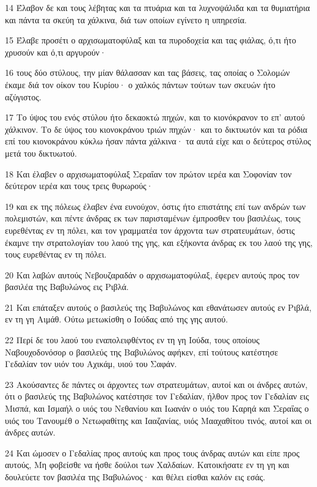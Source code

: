 \par 14 Έλαβον δε και τους λέβητας και τα πτυάρια και τα λυχνοψάλιδα και τα θυμιατήρια και πάντα τα σκεύη τα χάλκινα, διά των οποίων εγίνετο η υπηρεσία.
\par 15 Έλαβε προσέτι ο αρχισωματοφύλαξ και τα πυροδοχεία και τας φιάλας, ό,τι ήτο χρυσούν και ό,τι αργυρούν·
\par 16 τους δύο στύλους, την μίαν θάλασσαν και τας βάσεις, τας οποίας ο Σολομών έκαμε διά τον οίκον του Κυρίου· ο χαλκός πάντων τούτων των σκευών ήτο αζύγιστος.
\par 17 Το ύψος του ενός στύλου ήτο δεκαοκτώ πηχών, και το κιονόκρανον το επ' αυτού χάλκινον. Το δε ύψος του κιονοκράνου τριών πηχών· και το δικτυωτόν και τα ρόδια επί του κιονοκράνου κύκλω ήσαν πάντα χάλκινα· τα αυτά είχε και ο δεύτερος στύλος μετά του δικτυωτού.
\par 18 Και έλαβεν ο αρχισωματοφύλαξ Σεραΐαν τον πρώτον ιερέα και Σοφονίαν τον δεύτερον ιερέα και τους τρεις θυρωρούς·
\par 19 και εκ της πόλεως έλαβεν ένα ευνούχον, όστις ήτο επιστάτης επί των ανδρών των πολεμιστών, και πέντε άνδρας εκ των παρισταμένων έμπροσθεν του βασιλέως, τους ευρεθέντας εν τη πόλει, και τον γραμματέα τον άρχοντα των στρατευμάτων, όστις έκαμνε την στρατολογίαν του λαού της γης, και εξήκοντα άνδρας εκ του λαού της γης, τους ευρεθέντας εν τη πόλει.
\par 20 Και λαβών αυτούς Νεβουζαραδάν ο αρχισωματοφύλαξ, έφερεν αυτούς προς τον βασιλέα της Βαβυλώνος εις Ριβλά.
\par 21 Και επάταξεν αυτούς ο βασιλεύς της Βαβυλώνος και εθανάτωσεν αυτούς εν Ριβλά, εν τη γη Αιμάθ. Ούτω μετωκίσθη ο Ιούδας από της γης αυτού.
\par 22 Περί δε του λαού του εναπολειφθέντος εν τη γη Ιούδα, τους οποίους Ναβουχοδονόσορ ο βασιλεύς της Βαβυλώνος αφήκεν, επί τούτους κατέστησε Γεδαλίαν τον υιόν του Αχικάμ, υιού του Σαφάν.
\par 23 Ακούσαντες δε πάντες οι άρχοντες των στρατευμάτων, αυτοί και οι άνδρες αυτών, ότι ο βασιλεύς της Βαβυλώνος κατέστησε τον Γεδαλίαν, ήλθον προς τον Γεδαλίαν εις Μισπά, και Ισμαήλ ο υιός του Νεθανίου και Ιωανάν ο υιός του Καρηά και Σεραΐας ο υιός του Τανουμέθ ο Νετωφαθίτης και Ιααζανίας, υιός Μααχαθίτου τινός, αυτοί και οι άνδρες αυτών.
\par 24 Και ώμοσεν ο Γεδαλίας προς αυτούς και προς τους άνδρας αυτών και είπε προς αυτούς, Μη φοβείσθε να ήσθε δούλοι των Χαλδαίων. Κατοικήσατε εν τη γη και δουλεύετε τον βασιλέα της Βαβυλώνος· και θέλει είσθαι καλόν εις εσάς.
